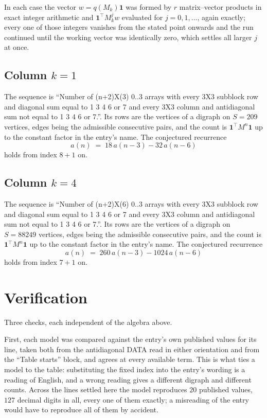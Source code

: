 \documentclass[11pt,a4paper]{article}
\theoremstyle{plain}
\theoremstyle{definition}
\begin{document}
In each case the vector $w=q(M_k)\mathbf{1}$ was formed by $r$ matrix--vector products in
exact integer arithmetic and $\mathbf{1}^{\!\top}M_k^{j}w$ evaluated for $j=0,1,\dots$,
again exactly; every one of those integers vanishes from the stated point onwards and the run
continued until the working vector was identically zero, which settles all larger $j$ at once.

\subsection*{Column $k$$=1$}
The sequence is ``Number of (n+2)X(3) 0..3 arrays with every 3X3 subblock row and diagonal sum equal to 1 3 4 6 or 7 and every 3X3 column and antidiagonal sum not equal to 1 3 4 6 or 7.''. Its rows are the vertices of a digraph on
$S=209$ vertices, edges being the admissible consecutive pairs, and the count is
$\mathbf{1}^{\!\top}M^{n}\mathbf{1}$ up to the constant factor in the entry's name.
The conjectured recurrence
\[
a(n)\;=\;18\,a(n-3) - 32\,a(n-6)
\]
holds from index $8+1$ on.

\subsection*{Column $k$$=4$}
The sequence is ``Number of (n+2)X(6) 0..3 arrays with every 3X3 subblock row and diagonal sum equal to 1 3 4 6 or 7 and every 3X3 column and antidiagonal sum not equal to 1 3 4 6 or 7.''. Its rows are the vertices of a digraph on
$S=88249$ vertices, edges being the admissible consecutive pairs, and the count is
$\mathbf{1}^{\!\top}M^{n}\mathbf{1}$ up to the constant factor in the entry's name.
The conjectured recurrence
\[
a(n)\;=\;260\,a(n-3) - 1024\,a(n-6)
\]
holds from index $7+1$ on.

\section{Verification}

Three checks, each independent of the algebra above.

First, each model was compared against the entry's own published values for its line, taken
both from the antidiagonal DATA read in either orientation and from the ``Table starts''
block, and agrees at every available term. This is what ties a model to the table:
substituting the fixed index into the entry's wording is a reading of English, and a wrong
reading gives a different digraph and different counts. Across the lines settled here the
model reproduces $20$ published values, $127$ decimal digits in all, every one of
them exactly; a misreading of the entry would have to reproduce all of them by accident.
\end{document}

